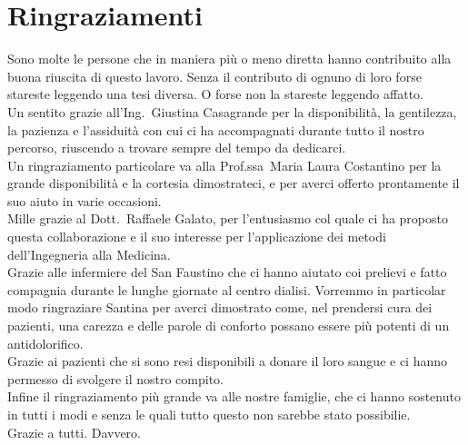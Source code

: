 \chapter*{Ringraziamenti}

Sono molte le persone che in maniera più o meno diretta hanno contribuito alla buona riuscita di questo lavoro. Senza il contributo di ognuno di loro forse stareste leggendo una tesi diversa. O forse non la stareste leggendo affatto.
\vspace{10pt}\\
Un sentito grazie all'Ing.~Giustina Casagrande per la disponibilità, la gentilezza, la pazienza e l'assiduità con cui ci ha accompagnati durante tutto il nostro percorso, riuscendo a trovare sempre del tempo da dedicarci.
\vspace{10pt}\\
Un ringraziamento particolare va alla Prof.ssa~Maria Laura Costantino per la grande disponibilità e la cortesia dimostrateci, e per averci offerto prontamente il suo aiuto in varie occasioni.
\vspace{10pt}\\
Mille grazie al Dott.~Raffaele Galato, per l'entusiasmo col quale ci ha proposto questa collaborazione e il suo interesse per l'applicazione dei metodi dell'Ingegneria alla Medicina.
\vspace{10pt}\\
Grazie alle infermiere del San Faustino che ci hanno aiutato coi prelievi e fatto compagnia durante le lunghe giornate al centro dialisi. Vorremmo in particolar modo ringraziare Santina per averci dimostrato come, nel prendersi cura dei pazienti, una carezza e delle parole di conforto possano essere più potenti di un antidolorifico.
\vspace{10pt}\\
Grazie ai pazienti che si sono resi disponibili a donare il loro sangue e ci hanno permesso di svolgere il nostro compito.
\vspace{10pt}\\
Infine il ringraziamento più grande va alle nostre famiglie, che ci hanno sostenuto in tutti i modi e senza le quali tutto questo non sarebbe stato possibilie.
\vspace{30pt}\\
Grazie a tutti. Davvero.
